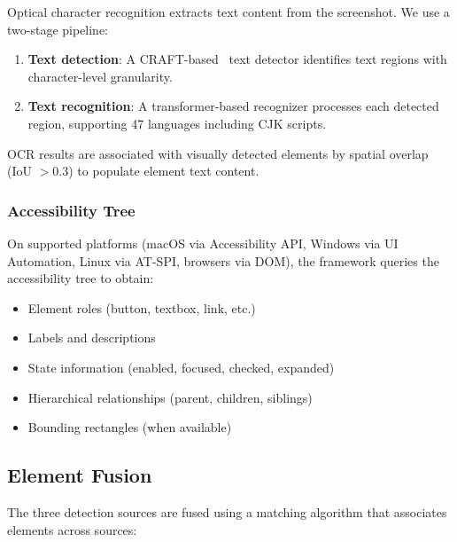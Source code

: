 \documentclass[11pt,twocolumn]{article}
\begin{document}
Optical character recognition extracts text content from the screenshot. We use a two-stage pipeline:

\begin{enumerate}[leftmargin=*]
    \item \textbf{Text detection}: A CRAFT-based~\cite{baek2019craft} text detector identifies text regions with character-level granularity.
    \item \textbf{Text recognition}: A transformer-based recognizer processes each detected region, supporting 47 languages including CJK scripts.
\end{enumerate}

OCR results are associated with visually detected elements by spatial overlap (IoU $> 0.3$) to populate element text content.

\subsubsection{Accessibility Tree}

On supported platforms (macOS via Accessibility API, Windows via UI Automation, Linux via AT-SPI, browsers via DOM), the framework queries the accessibility tree to obtain:

\begin{itemize}[leftmargin=*]
    \item Element roles (button, textbox, link, etc.)
    \item Labels and descriptions
    \item State information (enabled, focused, checked, expanded)
    \item Hierarchical relationships (parent, children, siblings)
    \item Bounding rectangles (when available)
\end{itemize}

\subsection{Element Fusion}

The three detection sources are fused using a matching algorithm that associates elements across sources:
\end{document}
